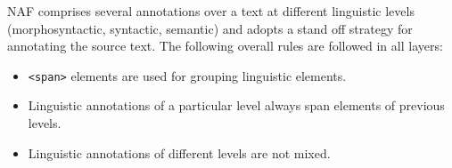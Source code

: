 
NAF comprises several annotations over a text at different linguistic levels
(morphosyntactic, syntactic, semantic) and adopts a stand off strategy for
annotating the source text. The following overall rules are followed in all
layers:

\begin{itemize}
\item \texttt{<span>} elements are used for grouping linguistic elements.
\item Linguistic annotations of a particular level always span elements of previous levels.
\item Linguistic annotations of different levels are not mixed.
\end{itemize}


